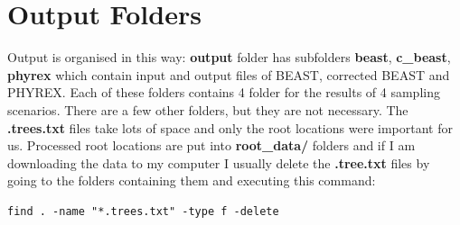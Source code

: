 \section*{Output Folders}
Output is organised in this way: \textbf{output} folder has subfolders 
\textbf{beast}, \textbf{c\_beast}, \textbf{phyrex} which contain input and output files of BEAST, corrected BEAST and PHYREX. Each of these folders contains 4 folder for the results of 4 sampling scenarios. There are a few other folders, but they are not necessary.
The \textbf{.trees.txt} files take lots of space and only the root locations were important for us. Processed root locations are put into \textbf{root\_data/} folders and if I am downloading the data to my computer I usually delete the \textbf{.tree.txt} files by going to the folders containing them and executing this command:

\begin{verbatim}
find . -name "*.trees.txt" -type f -delete
\end{verbatim} 


